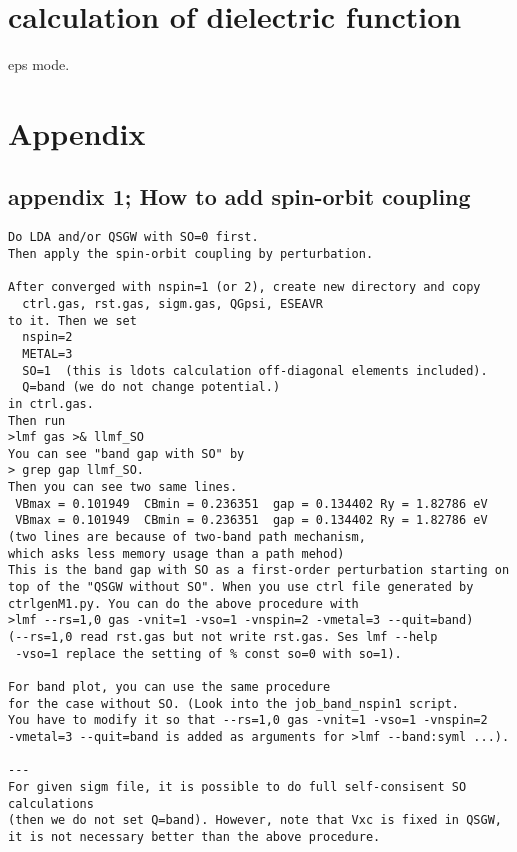 \documentclass[a4paper,10pt,epsf,fleqn]{article}
\begin{document}
\section{calculation of dielectric function}
  eps mode.


\section{Appendix}
\subsection{appendix 1; How to add spin-orbit coupling}
\begin{verbatim}
Do LDA and/or QSGW with SO=0 first.
Then apply the spin-orbit coupling by perturbation.

After converged with nspin=1 (or 2), create new directory and copy
  ctrl.gas, rst.gas, sigm.gas, QGpsi, ESEAVR
to it. Then we set
  nspin=2 
  METAL=3
  SO=1  (this is ldots calculation off-diagonal elements included).
  Q=band (we do not change potential.)
in ctrl.gas. 
Then run
>lmf gas >& llmf_SO
You can see "band gap with SO" by 
> grep gap llmf_SO.
Then you can see two same lines.
 VBmax = 0.101949  CBmin = 0.236351  gap = 0.134402 Ry = 1.82786 eV
 VBmax = 0.101949  CBmin = 0.236351  gap = 0.134402 Ry = 1.82786 eV
(two lines are because of two-band path mechanism, 
which asks less memory usage than a path mehod)
This is the band gap with SO as a first-order perturbation starting on
top of the "QSGW without SO". When you use ctrl file generated by
ctrlgenM1.py. You can do the above procedure with
>lmf --rs=1,0 gas -vnit=1 -vso=1 -vnspin=2 -vmetal=3 --quit=band)
(--rs=1,0 read rst.gas but not write rst.gas. Ses lmf --help
 -vso=1 replace the setting of % const so=0 with so=1).

For band plot, you can use the same procedure 
for the case without SO. (Look into the job_band_nspin1 script.
You have to modify it so that --rs=1,0 gas -vnit=1 -vso=1 -vnspin=2
-vmetal=3 --quit=band is added as arguments for >lmf --band:syml ...).

---
For given sigm file, it is possible to do full self-consisent SO calculations
(then we do not set Q=band). However, note that Vxc is fixed in QSGW, 
it is not necessary better than the above procedure.

\end{verbatim}
\end{document}
